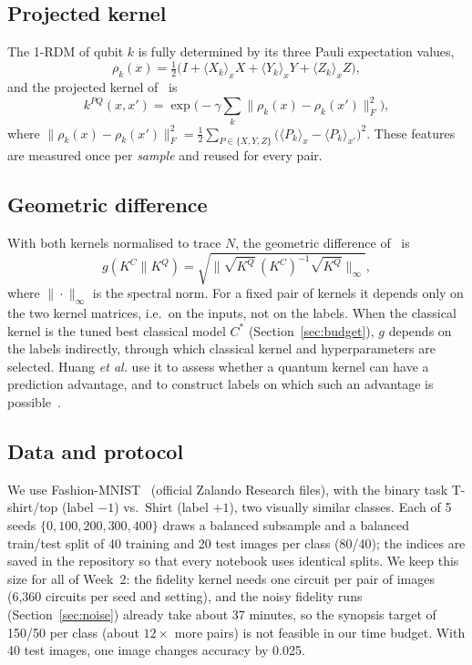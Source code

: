 \documentclass[conference]{IEEEtran}
\begin{document}
\subsection{Projected kernel}
The 1-RDM of qubit $k$ is fully determined by its three Pauli expectation values,
\begin{equation}
\rho_k(x)=\tfrac{1}{2}\big(I+\langle X_k\rangle_x X+\langle Y_k\rangle_x Y+\langle Z_k\rangle_x Z\big),
\end{equation}
and the projected kernel of~\cite{huang2021} is
\begin{equation}
k^{PQ}(x,x') = \exp\!\Big(-\gamma \sum_{k}\big\|\rho_k(x)-\rho_k(x')\big\|_F^{2}\Big),
\end{equation}
where $\|\rho_k(x)-\rho_k(x')\|_F^2=\tfrac{1}{2}\sum_{P\in\{X,Y,Z\}}\big(\langle P_k\rangle_x-\langle P_k\rangle_{x'}\big)^2$. These features are measured once per \emph{sample} and reused for every pair.

\subsection{Geometric difference}
With both kernels normalised to trace $N$, the geometric difference of~\cite{huang2021} is
\begin{equation}
g(K^{C}\|K^{Q})=\sqrt{\Big\|\sqrt{K^{Q}}\,(K^{C})^{-1}\sqrt{K^{Q}}\Big\|_{\infty}},
\end{equation}
where $\|\cdot\|_\infty$ is the spectral norm. For a fixed pair of kernels it depends only on the two kernel matrices, i.e.\ on the inputs, not on the labels. When the classical kernel is the tuned best classical model $C^\ast$ (Section~\ref{sec:budget}), $g$ depends on the labels indirectly, through which classical kernel and hyperparameters are selected. Huang \textit{et al.} use it to assess whether a quantum kernel can have a prediction advantage, and to construct labels on which such an advantage is possible~\cite{huang2021}.

\subsection{Data and protocol}
We use Fashion-MNIST~\cite{xiao2017} (official Zalando Research files), with the binary task T-shirt/top (label $-1$) vs.\ Shirt (label $+1$), two visually similar classes. Each of 5 seeds $\{0,100,200,300,400\}$ draws a balanced subsample and a balanced train/test split of 40 training and 20 test images per class (80/40); the indices are saved in the repository so that every notebook uses identical splits. We keep this size for all of Week~2: the fidelity kernel needs one circuit per pair of images (6{,}360 circuits per seed and setting), and the noisy fidelity runs (Section~\ref{sec:noise}) already take about 37 minutes, so the synopsis target of 150/50 per class (about $12\times$ more pairs) is not feasible in our time budget. With 40 test images, one image changes accuracy by 0.025.
\end{document}
